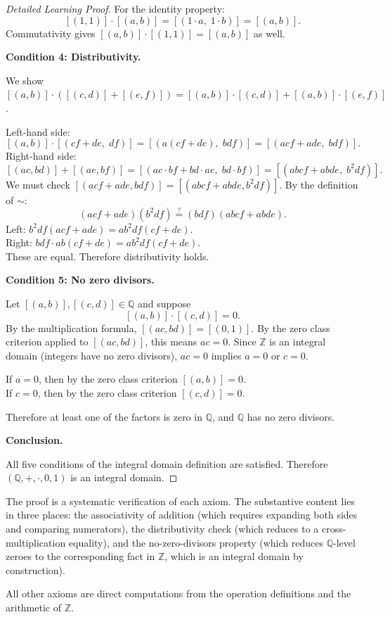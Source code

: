 \begin{proof}[Detailed Learning Proof]
For the identity property:
\[
[(1,1)]\cdot[(a,b)]
= [(1\cdot a,\; 1\cdot b)]
= [(a,b)].
\]
Commutativity gives $[(a,b)]\cdot[(1,1)] = [(a,b)]$ as well.

\textbf{Condition 4: Distributivity.}

We show $[(a,b)]\cdot([(c,d)]+[(e,f)]) = [(a,b)]\cdot[(c,d)] + [(a,b)]\cdot[(e,f)]$.

Left-hand side:
\[
[(a,b)]\cdot[(cf+de,\;df)]
= [(a(cf+de),\;bdf)]
= [(acf+ade,\;bdf)].
\]
Right-hand side:
\[
[(ac,bd)] + [(ae,bf)]
= [(ac\cdot bf + bd\cdot ae,\; bd\cdot bf)]
= [(abcf+abde,\; b^2df)].
\]
We must check $[(acf+ade,bdf)] = [(abcf+abde,b^2df)]$.
By the definition of $\sim$:
\[
(acf+ade)(b^2df) \stackrel{?}{=} (bdf)(abcf+abde).
\]
Left: $b^2df(acf+ade) = ab^2df(cf+de)$.\\
Right: $bdf\cdot ab(cf+de) = ab^2df(cf+de)$.\\
These are equal. Therefore distributivity holds.

\textbf{Condition 5: No zero divisors.}

Let $[(a,b)],[(c,d)]\in\mathbb{Q}$ and suppose
\[
[(a,b)]\cdot[(c,d)] = 0.
\]
By the multiplication formula, $[(ac,bd)] = [(0,1)]$.
By the zero class criterion applied to $[(ac,bd)]$, this means $ac = 0$.
Since $\mathbb{Z}$ is an integral domain (integers have no zero divisors),
$ac = 0$ implies $a = 0$ or $c = 0$.

If $a = 0$, then by the zero class criterion $[(a,b)] = 0$.\\
If $c = 0$, then by the zero class criterion $[(c,d)] = 0$.

Therefore at least one of the factors is zero in $\mathbb{Q}$, and $\mathbb{Q}$
has no zero divisors.

\textbf{Conclusion.}

All five conditions of the integral domain definition are satisfied.
Therefore $(\mathbb{Q},+,\cdot,0,1)$ is an integral domain.
\end{proof}

\begin{remark*}
The proof is a systematic verification of each axiom. The substantive
content lies in three places: the associativity of addition (which requires
expanding both sides and comparing numerators), the distributivity check
(which reduces to a cross-multiplication equality), and the no-zero-divisors
property (which reduces $\mathbb{Q}$-level zeroes to the corresponding fact
in $\mathbb{Z}$, which is an integral domain by construction).

All other axioms are direct computations from the operation definitions and
the arithmetic of $\mathbb{Z}$.
\end{remark*}

